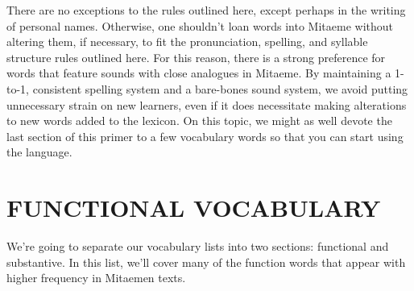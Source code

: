 \documentclass[a4paper]{article}
\begin{document}
There are no exceptions to the rules outlined here, except perhaps in the writing of personal names. Otherwise, one shouldn't loan words into Mitaeme without altering them, if necessary, to fit the pronunciation, spelling, and syllable structure rules outlined here. For this reason, there is a strong preference for words that feature sounds with close analogues in Mitaeme. By maintaining a 1-to-1, consistent spelling system and a bare-bones sound system, we avoid putting unnecessary strain on new learners, even if it does necessitate making alterations to new words added to the lexicon. On this topic, we might as well devote the last section of this primer to a few vocabulary words so that you can start using the language.

\section{FUNCTIONAL VOCABULARY}

We're going to separate our vocabulary lists into two sections: functional and substantive. In this list, we'll cover many of the function words that appear with higher frequency in Mitaemen texts.
\end{document}
